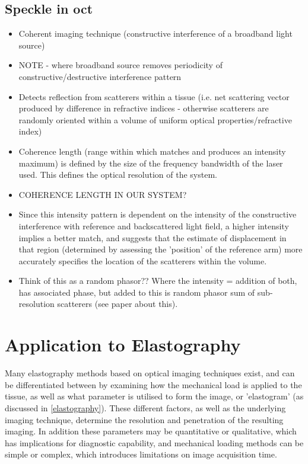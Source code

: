 \subsection{Speckle in \ac{oct}}
\begin{itemize}
	\item Coherent imaging technique (constructive interference of a broadband light source)
	\item NOTE - where broadband source removes periodicity of constructive/destructive interference pattern
	\item Detects reflection from scatterers within a tissue (i.e. net scattering vector produced by difference in refractive indices - otherwise scatterers are randomly oriented within a volume of uniform optical properties/refractive index)
	\item Coherence length (range within which matches and produces an intensity maximum) is defined by the size of the frequency bandwidth of the laser used. This defines the optical resolution of the system.
	\item COHERENCE LENGTH IN OUR SYSTEM?
	\item Since this intensity pattern is dependent on the intensity of the constructive interference with reference and backscattered light field, a higher intensity implies a better match, and suggests that the estimate of displacement in that region (determined by assessing the 'position' of the reference arm) more accurately specifies the location of the scatterers within the volume.
	\item Think of this as a random phasor?? Where the intensity = addition of both, has associated phase, but added to this is random phasor sum of sub-resolution scatterers (see paper about this).
\end{itemize}

\section{Application to Elastography}\label{application_elastography}

Many elastography methods based on optical imaging techniques exist, and can be differentiated between by examining how the mechanical load is applied to the tissue, as well as what parameter is utilised to form the image, or 'elastogram' (as discussed in \autoref{elastography}). These different factors, as well as the underlying imaging technique, determine the resolution and penetration of the resulting imaging. In addition these parameters may be quantitative or qualitative, which has implications for diagnostic capability, and mechanical loading methods can be simple or complex, which introduces limitations on image acquisition time.

